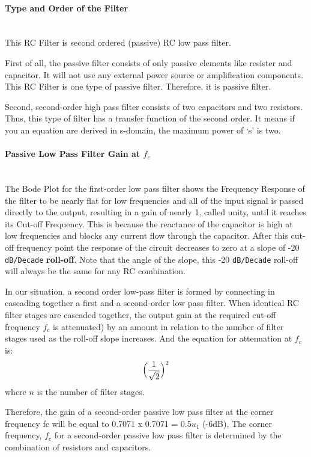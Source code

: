 \documentclass[
	a4paper,
	11pt,
]{article}
\begin{document}
\paragraph{Type and Order of the Filter}\mbox{}\\
This RC Filter is second ordered (passive) RC low pass filter.

First of all, the passive filter consists of only passive elements like resister and capacitor. It will not use any external power source or amplification components. This RC Filter is one type of passive filter. Therefore, it is passive filter.

Second, second-order high pass filter consists of two capacitors and two resistors. Thus, this type of filter has a transfer function of the second order. It means if you an equation are derived in s-domain, the maximum power of ‘s’ is two. 

\paragraph{Passive Low Pass Filter Gain at \(f_c\)}\mbox{}\\
The Bode Plot for the first-order low pass filter shows the Frequency Response of the filter to be nearly flat for low frequencies and all of the input signal is passed directly to the output, resulting in a gain of nearly 1, called unity, until it reaches its Cut-off Frequency. This is because the reactance of the capacitor is high at low frequencies and blocks any current flow through the capacitor. After this cut-off frequency point the response of the circuit decreases to zero at a slope of -20 \texttt{dB/Decade} \textbf{roll-off}. Note that the angle of the slope, this -20 \texttt{dB/Decade} roll-off will always be the same for any RC combination.

In our situation, a second order low-pass filter is formed by connecting in cascading together a first and a second-order low pass filter.  When identical RC filter stages are cascaded together, the output gain at the required cut-off frequency \( f_c \) is attenuated) by an amount in relation to the number of filter stages used as the roll-off slope increases. And the equation for attenuation at \(f_c\) is:
\begin{equation}
    \Bigl( \frac{1}{\sqrt 2} \Bigl)^2
\end{equation}
where \(n\) is the number of filter stages.

Therefore, the gain of a second-order passive low pass filter at the corner frequency ƒc will be equal to 0.7071 x 0.7071 = 0.5\(u_1\) (-6dB), The corner frequency, \(f_c\) for a second-order passive low pass filter is determined by the combination of resistors and capacitors.
\end{document}
